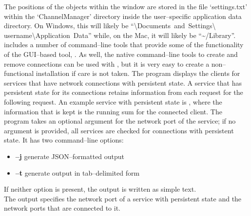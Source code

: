 The positions of the objects within the window are stored in the file `settings.txt'
within the `ChannelManager' directory inside the user--specific application data
directory.
On Windows, this will likely be ``\textbackslash{}Documents~and~Settings\textbackslash{}%
username\textbackslash{}Application~Data'' while, on the Mac, it will likely be
``\textasciitilde/Library''.
\secondaryEnd{}
\newpage
{}
\mplusm{} includes a number of command--line tools that provide some of the functionality
of the GUI--based tool, .
As well, the native \yarp{} command--line tools to create and remove connections can be
used with \mplusm{}, but it is very easy to create a non--functional installation if care
is not taken.
The program  displays the clients for services that have
\yarp{} network connections with persistent state.
A service that has persistent state for its connections retains information from each
request for the following request.
An example service with persistent state is
, where the information that is kept is the
running sum for the connected client.
The program takes an optional argument for the \yarp{} network port of the service; if no
argument is provided, all services are checked for connections with persistent state.
It has two command--line options:
\begin{itemize}
\item \textbf{--j} generate JSON--formatted output
\item \textbf{--t} generate output in tab--delimited form
\end{itemize}
If neither option is present, the output is written as simple text.\\

The output specifies the \yarp{} network port of a service with persistent state and the
\yarp{} network ports that are connected to it.\\

